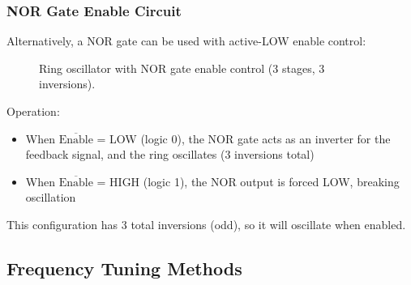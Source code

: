 \documentclass[10pt]{article}
\begin{document}
\subsubsection{NOR Gate Enable Circuit}

Alternatively, a NOR gate can be used with active-LOW enable control: 

\begin{figure}[h]
\centering
{}
\caption{Ring oscillator with NOR gate enable control (3 stages, 3 inversions).}
\label{fig:ring_nor}
\end{figure}

Operation:
\begin{itemize}
    \item When $\overline{\text{Enable}}$ = LOW (logic 0), the NOR gate acts as an inverter for the feedback signal, and the ring oscillates (3 inversions total)
    \item When $\overline{\text{Enable}}$ = HIGH (logic 1), the NOR output is forced LOW, breaking oscillation
\end{itemize}

This configuration has 3 total inversions (odd), so it will oscillate when enabled.

\subsection{Frequency Tuning Methods}
\end{document}
